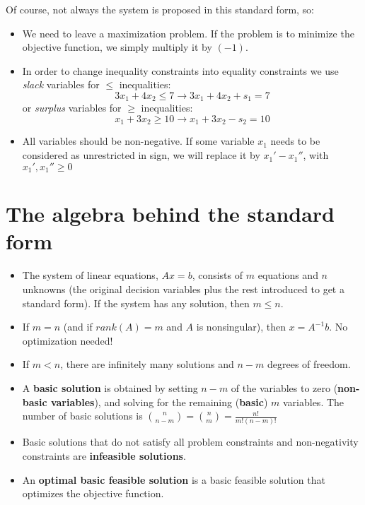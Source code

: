 \documentclass[c]{beamer}
\begin{document}
\begin{frame}
Of course, not always the system is proposed in this standard form, so\cite{carter}:
\begin{itemize}
  \item We need to leave a maximization problem. If the problem is to minimize the objective function, we simply multiply it by $(-1)$.
  \item In order to change inequality constraints into equality constraints we use {\it slack} variables for $\leq$ inequalities:
  \[
  3x_1+4x_2 \leq 7  \rightarrow  3x_1+4x_2+s_1 =7
  \]
  or {\it surplus} variables for $\geq$ inequalities:
  \[
  x_1+3x_2\geq 10 \rightarrow x_1+3x_2 -s_2 =10
  \]
  \item All variables should be non-negative. If some variable $x_1$ needs to be considered as unrestricted in sign, we will replace it by $x_1'-x_1''$, with $x_1',x_1''\geq 0$
\end{itemize}
\end{frame}

\section{The algebra behind the standard form}

\begin{frame}
  \begin{itemize}
 \item The system of linear equations, $Ax = b$, consists of $m$ equations and $n$
unknowns (the original decision variables plus the rest introduced to get a standard form). If the system has any solution, then $m \leq n$.
\item If $m = n$ (and if $rank (A) = m$ and $A$ is nonsingular), then 
$x = A^{-1}b$. No optimization needed!
\item If $m < n$, there are infinitely many solutions and $n -m$ degrees of freedom. 
\item A {\bf basic solution} is obtained by setting $n - m$ of the variables to zero ({\bf non-basic variables}), and solving for the remaining ({\bf basic}) $m$ variables. The number of basic solutions is $\binom{n}{n-m}=\binom{n}{m}=\frac{n!}{m!(n-m)!}$
\item Basic solutions that do not satisfy all problem constraints and non-negativity constraints are {\bf infeasible solutions}.
\item An {\bf optimal basic feasible solution} is a
basic feasible solution that optimizes the objective function. 
\end{itemize}
\end{frame}
\end{document}
